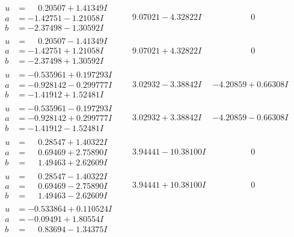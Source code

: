 \documentclass[1p]{elsarticle_modified}
\theoremstyle{definition}
\begin{document}
$$\begin{array}{c|c|c}
\begin{aligned}
u &= \phantom{-}0.20507 + 1.41349 I \\
a &= -1.42751 - 1.21058 I \\
b &= -2.37498 - 1.30592 I\end{aligned}
 & \phantom{-}9.07021 - 4.32822 I & \phantom{-0.000000 } 0 \\ \hline\begin{aligned}
u &= \phantom{-}0.20507 - 1.41349 I \\
a &= -1.42751 + 1.21058 I \\
b &= -2.37498 + 1.30592 I\end{aligned}
 & \phantom{-}9.07021 + 4.32822 I & \phantom{-0.000000 } 0 \\ \hline\begin{aligned}
u &= -0.535961 + 0.197293 I \\
a &= -0.928142 - 0.299777 I \\
b &= -1.41912 + 1.52481 I\end{aligned}
 & \phantom{-}3.02932 - 3.38842 I & -4.20859 + 0.66308 I \\ \hline\begin{aligned}
u &= -0.535961 - 0.197293 I \\
a &= -0.928142 + 0.299777 I \\
b &= -1.41912 - 1.52481 I\end{aligned}
 & \phantom{-}3.02932 + 3.38842 I & -4.20859 - 0.66308 I \\ \hline\begin{aligned}
u &= \phantom{-}0.28547 + 1.40322 I \\
a &= \phantom{-}0.69469 + 2.75890 I \\
b &= \phantom{-}1.49463 + 2.62609 I\end{aligned}
 & \phantom{-}3.94441 - 10.38100 I & \phantom{-0.000000 } 0 \\ \hline\begin{aligned}
u &= \phantom{-}0.28547 - 1.40322 I \\
a &= \phantom{-}0.69469 - 2.75890 I \\
b &= \phantom{-}1.49463 - 2.62609 I\end{aligned}
 & \phantom{-}3.94441 + 10.38100 I & \phantom{-0.000000 } 0 \\ \hline\begin{aligned}
u &= -0.533864 + 0.110524 I \\
a &= -0.09491 + 1.80554 I \\
b &= \phantom{-}0.83694 - 1.34375 I\end{aligned}

\end{array}$$
\end{document}
